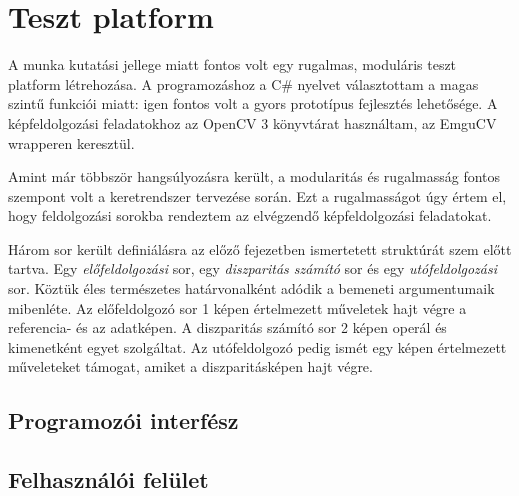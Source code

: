 \chapter{Teszt platform}\label{sect:Software}

A munka kutatási jellege miatt fontos volt egy rugalmas, moduláris teszt platform létrehozása.
A programozáshoz a C\# nyelvet választottam a magas szintű funkciói miatt: igen fontos volt a gyors prototípus fejlesztés lehetősége.
A képfeldolgozási feladatokhoz az OpenCV 3 könyvtárat használtam, az EmguCV wrapperen keresztül.

Amint már többször hangsúlyozásra került, a modularitás és rugalmasság fontos szempont volt a keretrendszer tervezése során.
Ezt a rugalmasságot úgy értem el, hogy feldolgozási sorokba rendeztem az elvégzendő képfeldolgozási feladatokat.

Három sor került definiálásra az előző fejezetben ismertetett struktúrát szem előtt tartva.
Egy \emph{előfeldolgozási} sor, egy \emph{diszparitás számító} sor és egy \emph{utófeldolgozási} sor.
Köztük éles természetes határvonalként adódik a bemeneti argumentumaik mibenléte.
Az előfeldolgozó sor 1 képen értelmezett műveletek hajt végre a referencia- és az adatképen.
A diszparitás számító sor 2 képen operál és kimenetként egyet szolgáltat.
Az utófeldolgozó pedig ismét egy képen értelmezett műveleteket támogat, amiket a diszparitásképen hajt végre.



\section{Programozói interfész}\label{sect:ProgInterface}



\section{Felhasználói felület}\label{sect:UserInterface}


